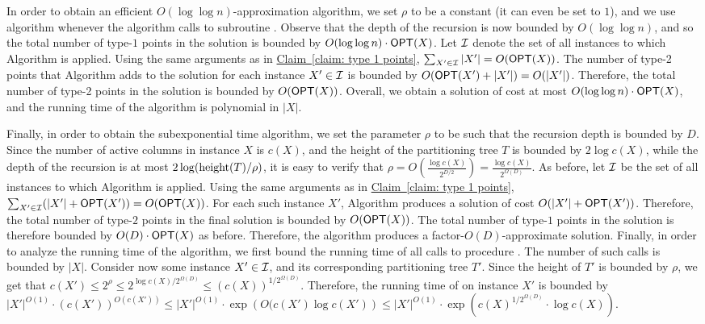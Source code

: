 \documentclass[11pt]{article}
\numberwithin{equation}{section}
\theoremstyle{definition}
\theoremstyle{plain}
\newcommand{\expref}[2]{\hyperref[#2]{#1~\ref{#2}}}
\begin{document}
In order to obtain an efficient $O(\log\log n)$-approximation algorithm, we set $\rho$ to be a constant (it can even be set to $1$), and we use  algorithm \leafBST whenever the algorithm calls to subroutine \leafBST. Observe that the depth of the recursion is now bounded by $O(\log\log n)$, and so the total number of type-$1$ points in the solution is bounded by $O(\log\log n)\cdot \mbox{\sf OPT}(X)$. Let ${\mathcal{I}}$ denote the set of all instances to which Algorithm \leafBST is applied. Using the same arguments as in \expref{Claim}{claim: type 1 points}, $\sum_{X'\in {\mathcal{I}}}|X'|=O(\mbox{\sf OPT}(X))$. The number of type-2 points that Algorithm \leafBST adds to the solution for each instance $X'\in {\mathcal{I}}$ is bounded by $O(\mbox{\sf OPT}(X') + |X'|)=O(|X'|)$. Therefore, the total number of type-2 points in the solution is bounded by $O(\mbox{\sf OPT}(X))$. Overall, we obtain a solution of cost at most $O(\log\log n)\cdot \mbox{\sf OPT}(X)$, and the running time of the algorithm is polynomial in $|X|$.


Finally, in order to obtain the subexponential time algorithm, we set the parameter $\rho$ to be such that the recursion depth is bounded by $D$. 
Since the number of active columns in instance $X$ is $c(X)$, and the height of the partitioning tree $T$ is bounded by $2\log c(X)$, while the depth of the recursion is at most $2\log(\operatorname{height}(T)/\rho)$, it is easy to verify that $\rho=O\left (\frac{\log c(X)}{2^{D/2}}\right )=\frac{\log c(X)}{2^{\Omega(D)}}$.  As before, let ${\mathcal{I}}$ be the set of all instances to which Algorithm \leafBST is applied.
 Using the same arguments as in \expref{Claim}{claim: type 1 points}, $\sum_{X'\in {\mathcal{I}}}(|X'|+\mbox{\sf OPT}(X'))=O(\mbox{\sf OPT}(X))$. For each such instance $X'$, Algorithm \leafBST produces a solution of cost $O(|X'|+\mbox{\sf OPT}(X'))$. Therefore, the total number of type-$2$ points in the final solution is bounded by $O(\mbox{\sf OPT}(X))$. The total number of type-$1$ points  in the solution is therefore bounded by $O(D)\cdot \mbox{\sf OPT}(X)$ as before. Therefore, the algorithm produces a factor-$O(D)$-approximate solution. Finally, in order to analyze the running time of the algorithm, we first bound the running time of all calls to procedure \leafBST. The number of such calls is bounded by $|X|$. Consider now some instance $X'\in {\mathcal{I}}$, and its corresponding partitioning tree $T'$. Since the height of $T'$ is bounded by $\rho$, we get that $c(X')\leq 2^{\rho}\leq 2^{\log c(X)/2^{\Omega(D)}}\leq (c(X))^{1/2^{\Omega(D)}}$. 
 Therefore, the running time of \leafBST on instance $X'$ is bounded by $|X'|^{O(1)}\cdot (c(X'))^{O(c(X'))}\leq |X'|^{O(1)}\cdot \exp\left({O(c(X')\log c(X')}\right )\leq |X'|^{O(1)}\cdot \exp\left({c(X)^{1/2^{\Omega(D)}}\cdot \log c(X)}\right )$.
 
\end{document}
